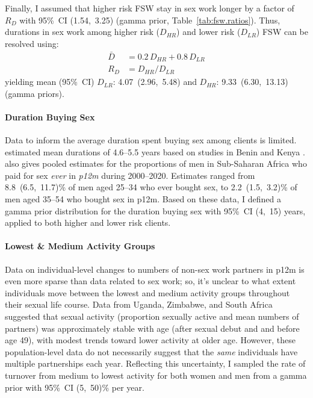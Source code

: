 \par
Finally, I assumed that higher risk FSW stay in sex work longer by a factor of
$R_{D}$ with 95\%~CI (1.54,~3.25) (gamma prior, Table~\ref{tab:fsw.ratios}).
Thus, durations in sex work among higher risk ($D_{HR}$) and lower risk ($D_{LR}$) FSW
can be resolved using:
\begin{equation}
  \begin{aligned}
    \bar{D} &= 0.2\,D_{HR} + 0.8\,D_{LR} \\
    R_{D} &= D_{HR} / D_{LR}
  \end{aligned}
\end{equation}
yielding mean (95\%~CI) $D_{LR}$: 4.07~(2.96,~5.48) and $D_{HR}$: 9.33~(6.30,~13.13) (gamma priors).
\paragraph{Duration Buying Sex}
Data to inform the average duration spent buying sex among clients is limited.
\citet{Fazito2012} estimated mean durations of 4.6--5.5 years
based on studies in Benin \cite{Lowndes2000} and Kenya \cite{Voeten2002}.
\citet[Table~G]{Hodgins2022} also gives pooled estimates for
the proportions of men in Sub-Saharan Africa
who paid for sex \emph{ever} \vs in \emph{p12m} during 2000--2020.
Estimates ranged from 8.8~(6.5,~11.7)\% of men aged 25--34 who ever bought sex,
to 2.2~(1.5,~3.2)\% of men aged 35--54 who bought sex in p12m.
Based on these data, I defined a gamma prior distribution for the duration buying sex
with 95\%~CI (4,~15) years, applied to both higher and lower risk clients.
\paragraph{Lowest \& Medium Activity Groups}
Data on individual-level changes to numbers of non-sex work partners in p12m
is even more sparse than data related to sex work;
so, it's unclear to what extent individuals move between the lowest and medium activity groups
throughout their sexual life course.
Data from Uganda, Zimbabwe, and South Africa \cite{Todd2009}
suggested that sexual activity (proportion sexually active and mean numbers of partners)
was approximately stable with age (after sexual debut and and before age 49),
with modest trends toward lower activity at older age.
However, these population-level data do not necessarily suggest that
the \emph{same} individuals have multiple partnerships each year.
Reflecting this uncertainty, I sampled
the rate of turnover from medium to lowest activity for both women and men
from a gamma prior with 95\%~CI (5,~50)\% per year.
